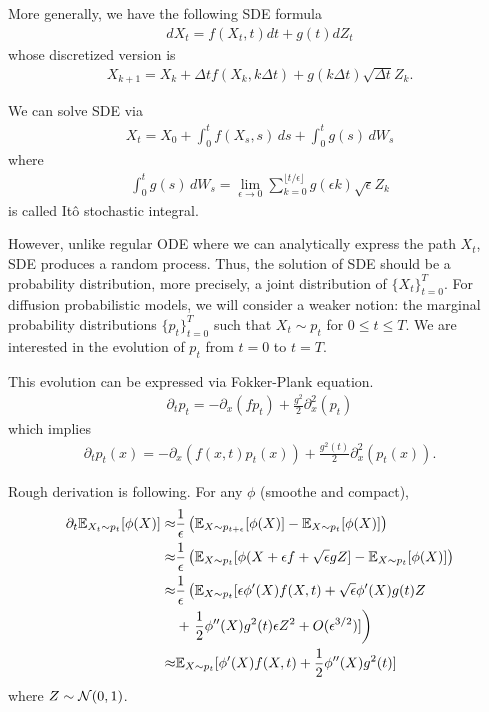 \documentclass[11pt, a4paper]{article}
\begin{document}
More generally, we have the following SDE formula
\begin{align}
    dX_t = f(X_t, t)dt + g(t) dZ_t
\end{align}
whose discretized version is
\begin{align}
    X_{k+1} = X_k + \Delta t f(X_k, k\Delta t) + g(k\Delta t)\sqrt{\Delta t}Z_k.
\end{align}

We can solve SDE via
\begin{align}
    X_t = X_0 + \int_0^t f(X_s, s)\, ds + \int_0^t g(s)\, dW_s
\end{align}
where 
\begin{align}
    \int_0^t g(s)\, dW_s = \lim_{\epsilon\rightarrow 0} \sum_{k=0}^{\lfloor t/\epsilon\rfloor} g(\epsilon k) \sqrt{\epsilon}Z_{k}
\end{align}
is called It\^o stochastic integral.

However, unlike regular ODE where we can analytically express the path $X_t$, SDE produces a random process.
Thus, the solution of SDE should be a probability distribution,
more precisely, a joint distribution of $\{X_t\}_{t=0}^T$.
For diffusion probabilistic models, we will consider a weaker notion: the marginal probability
distributions $\{p_t\}_{t=0}^T$ such that $X_t\sim p_t$ for $0\leq t\leq T$.
We are interested in the evolution of $p_t$ from $t=0$ to $t=T$.

This evolution can be expressed via Fokker-Plank equation.
\begin{align}
    \partial_t p_t = -\partial_x(fp_t) + \frac{g^2}{2}\partial_x^2 (p_t)
\end{align}
which implies
\begin{align}
    \partial_t p_t(x) = -\partial_x(f(x, t)p_t(x)) + \frac{g^2(t)}{2}\partial_x^2 (p_t(x)).
\end{align}

Rough derivation is following.
For any $\phi$ (smoothe and compact),
\begin{align}
    \partial_t\mathbb{E}_{X_t\sim p_t} [\phi(X)]
    \approx&  \frac{1}{\epsilon}\left(\mathbb{E}_{X\sim p_{t+\epsilon}} [\phi(X)] - \mathbb{E}_{X\sim p_{t}} [\phi(X)]\right)\\
    \approx&  \frac{1}{\epsilon}\left(\mathbb{E}_{X\sim p_{t}} [\phi(X + \epsilon f +\sqrt{\epsilon}gZ] - \mathbb{E}_{X\sim p_{t}} [\phi(X)]\right)\\
    \approx&  \frac{1}{\epsilon}\left(\mathbb{E}_{X\sim p_{t}} [\epsilon \phi'(X) f(X, t) + \sqrt{\epsilon}\phi'(X)g(t)Z\right.\nonumber\\
    &+ \left.\frac{1}{2}\phi''(X)g^2(t)\epsilon Z^2 + O(\epsilon^{3/2})]\right)\\
    \approx&  \mathbb{E}_{X\sim p_{t}} [\phi'(X) f(X, t) +  \frac{1}{2}\phi''(X)g^2(t)]
\end{align}
where $Z\sim {\cal N}(0, 1)$.
\end{document}
